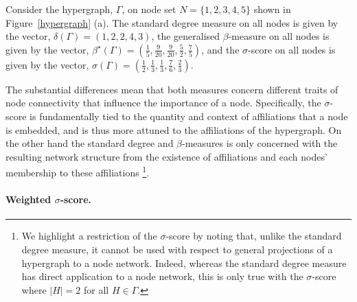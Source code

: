 \begin{example} \label{comparedegree}
Consider the hypergraph, $\Gamma $, on node set $N = \{ 1, 2, 3, 4, 5\}$ shown in Figure~\ref{hypergraph} (a). The standard degree measure on all nodes is given by the vector, $\delta(\Gamma ) = ( 1, 2, 2, 4, 3)$, the generalised $\beta$-measure on all nodes is given by the vector, $\beta^{\star}(\Gamma) = ( \frac{1}{5}, \frac{9}{20}, \frac{9}{20}, \frac{5}{2}, \frac{7}{5} )$, and the $\sigma$-score on all nodes is given by the vector, $\sigma(\Gamma ) = ( \frac{1}{2} , \frac{1}{3}, \frac{1}{3}, \frac{7}{6}, \frac{2}{3} )$.
\end{example}

The substantial differences mean that both measures concern different traits of node connectivity that influence the importance of a node. Specifically, the $\sigma$-score is fundamentally tied to the quantity and context of affiliations that a node is embedded, and is thus more attuned to the affiliations of the hypergraph. On the other hand the standard degree and $\beta$-measures is only concerned with the resulting network structure from the existence of affiliations and each nodes' membership to these affiliations \footnote{We highlight a restriction of the $\sigma$-score by noting that, unlike the standard degree measure, it cannot be used with respect to general projections of a hypergraph to a node network. Indeed, whereas the standard degree measure has direct application to a node network, this is only true with the $\sigma$-score where $| H | = 2$ for all $H \in \Gamma$.}.

\paragraph{Weighted $\sigma$-score.}

